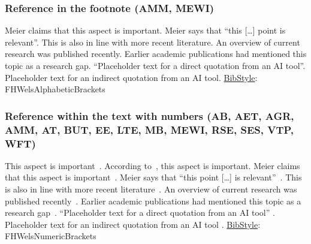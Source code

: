 \subsubsection{Reference in the footnote (AMM, MEWI)}
Meier claims that this aspect is important.\newline
Meier says that ``this [\dots] point is relevant''.\newline
This is also in line with more recent literature.\newline 
An overview of current research was published recently.\newline 
Earlier academic publications had mentioned this topic as a research gap.\newline  
“Placeholder text for a direct quotation from an AI tool”.  \newline
Placeholder text for an indirect quotation from an AI tool. \newline
\underline{BibStyle}: \textsf{FHWelsAlphabeticBrackets}

\subsubsection{Reference within the text with numbers (AB, AET, AGR, AMM, AT, BUT, EE, LTE, MB, MEWI, RSE, SES, VTP, WFT)}
This aspect is important~\cite[\cf][p.~5]{Meier:Globalisierung}.\newline
According to~\cite[][p.~5]{Meier:Globalisierung}, this aspect is important.\newline
Meier claims that this aspect is important~\cite[\cf][p.~5]{Meier:Globalisierung}.\newline
Meier says that ``this point [\dots] is relevant''~\cite[][p.~5]{Meier:Globalisierung}.\newline
This is also in line with more recent literature~\cite[\cf][p.~10]{Mueller:Meier}.\newline
An overview of current research was published recently~\cite[\cf][pp.~20-35]{Mueller:Meier:Huber}.\newline
Earlier academic publications had mentioned this topic as a research gap~\cite[\cf][p.~85]{Mueller:Meier:Huber:Tausch}.\newline
“Placeholder text for a direct quotation from an AI tool” \cite{OpenAI:2023}. \newline
Placeholder text for an indirect quotation from an AI tool \cite[\cf][]{OpenAI:2023}.\newline
\underline{BibStyle}: \textsf{FHWelsNumericBrackets}

